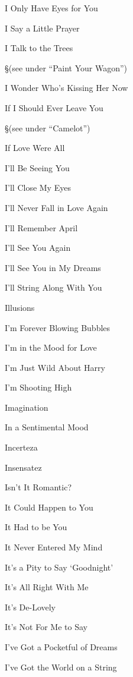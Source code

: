 \N I Only Have Eyes for You


\N I Say a Little Prayer


\N I Talk to the Trees

\nobreak
\S (see under ``Paint Your Wagon'')

\N I Wonder Who's Kissing Her Now


\N If I Should Ever Leave You

\nobreak
\S (see under ``Camelot'')

\N If Love Were All


\N I'll Be Seeing You


\N I'll Close My Eyes


\N I'll Never Fall in Love Again


\N I'll Remember April


\N I'll See You Again


\N I'll See You in My Dreams


\N I'll String Along With You


\N Illusions


\N I'm Forever Blowing Bubbles


\N {}


\N I'm in the Mood for Love


\N I'm Just Wild About Harry


\N I'm Shooting High


\N Imagination


\N In a Sentimental Mood


\N Incerteza


\N Insensatez


\N Isn't It Romantic?


\N {}


\N It Could Happen to You


\N It Had to be You


\N It Never Entered My Mind


\N It's a Pity to Say `Goodnight'


\N It's All Right With Me


\N It's De-Lovely


\N It's Not For Me to Say


\N I've Got a Pocketful of Dreams


\N I've Got the World on a String


